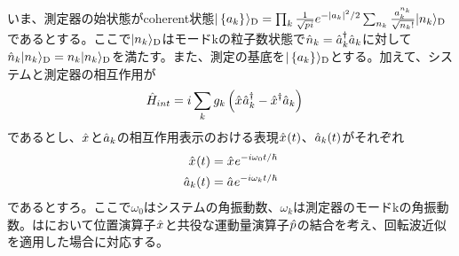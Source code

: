 \documentclass[10pt, a4paper]{jsarticle}
\begin{document}
いま、測定器の始状態がcoherent状態$| \left\{ a_{k} \right\}_{} \rangle_{\rm D} = \prod_{k} \frac{1}{\sqrt{pi}} e^{- | a_{k} |^{2}/2} \sum_{n_{k}} \frac{a_{k}^{n_{k}}}{\sqrt{n_{k}!}} | n_{k} \rangle_{\rm D}$であるとする。ここで$| n_{k} \rangle_{\rm D}$はモードkの粒子数状態で$\hat{n}_{k} = \hat{a}_{k}^{\dagger} \hat{a}_{k}$に対して$\hat{n}_{k} | n_{k} \rangle_{\rm D} = n_{k} | n_{k} \rangle_{\rm D}$を満たす。また、測定の基底を$| \left\{ a_{k} \right\}_{} \rangle_{\rm D}$とする。加えて、システムと測定器の相互作用が
\begin{equation}
\begin{split}
\label{eq:219}
	\hat{H}_{int} &= i \sum_{k} g_{k} \left( \hat{x}_{} \hat{a}_{k}^{\dagger} - \hat{x}_{}^{\dagger} \hat{a}_{k} \right)
\end{split}
\end{equation}
であるとし、$\hat{x}_{}$と$\hat{a}_{k}$の相互作用表示のおける表現$\hat{x}_{}(t)$、$\hat{a}_{k}(t)$がそれぞれ
\begin{equation}
\begin{split}
\label{eq:220}
	\hat{x}_{}(t) &= \hat{x}_{} e^{-i \omega_{0} t / \hbar} \\
	\hat{a}_{k}(t) &= \hat{a}_{} e^{-i \omega_{k} t / \hbar}
\end{split}
\end{equation}
であるとすろ。ここで$\omega_{0}$はシステムの角振動数、$\omega_{k}$は測定器のモードkの角振動数。はにおいて位置演算子$\hat{x}_{}$と共役な運動量演算子$\hat{p}_{}$の結合を考え、回転波近似を適用した場合に対応する。
\end{document}
